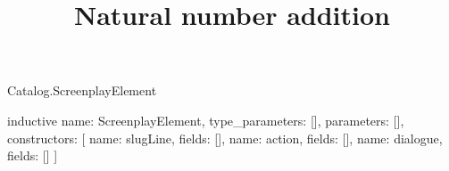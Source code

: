\begin{lexlean}{Catalog.ScreenplayElement}
\title{Natural number addition}
\begin{semanticmodule}
inductive{
  name: ScreenplayElement,
  type_parameters: [],
  parameters: [],
  constructors: [
    {name: slugLine, fields: []},
    {name: action, fields: []},
    {name: dialogue, fields: []}
  ]
}
\end{semanticmodule}
\end{lexlean}
